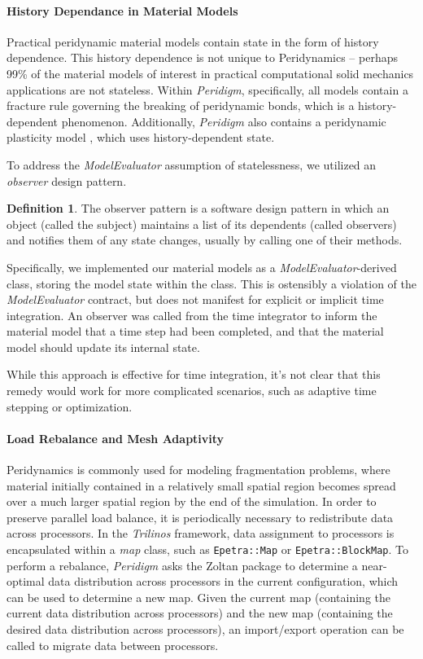 \documentclass[pdf,ps2pdf,12pt,report]{SANDreport}
\theoremstyle{plain}
\theoremstyle{definition}
\newtheorem{defn}{Definition}[section]
\theoremstyle{remark}
\numberwithin{equation}{section}
\begin{document}
\paragraph{History Dependance in Material Models}

Practical peridynamic material models contain state in the form of history dependence. This history dependence is not unique to Peridynamics -- perhaps 99\% of the material models of interest in practical computational solid mechanics applications are not stateless. Within \emph{Peridigm}, specifically, all models contain a fracture rule governing the breaking of peridynamic bonds, which is a history-dependent phenomenon. Additionally, \emph{Peridigm} also contains a peridynamic plasticity model \cite{Mitchell:2011:Plasticity}, which uses history-dependent state.

To address the \emph{ModelEvaluator} assumption of statelessness, we utilized an \emph{observer} design pattern.
\begin{defn}
The observer pattern is a software design pattern in which an object (called the subject) maintains a list of its dependents (called observers) and notifies them of any state changes, usually by calling one of their methods.
\end{defn}
Specifically, we implemented our material models as a \emph{ModelEvaluator}-derived class, storing the model state within the class. This is ostensibly a violation of the \emph{ModelEvaluator} contract, but does not manifest for explicit or implicit time integration. An observer was called from the time integrator to inform the material model that a time step had been completed, and that the material model should update its internal state.

While this approach is effective for time integration, it's not clear that this remedy would work for more complicated scenarios, such as adaptive time stepping or optimization.

\paragraph{Load Rebalance and Mesh Adaptivity}

Peridynamics is commonly used for modeling fragmentation problems, where material initially contained in a relatively small spatial region becomes spread over a much larger spatial region by the end of the simulation. In order to preserve parallel load balance, it is periodically necessary to redistribute data across processors. In the \emph{Trilinos} framework, data assignment to processors is encapsulated within a \emph{map} class, such as \verb"Epetra::Map" or \verb"Epetra::BlockMap". To perform a rebalance, \emph{Peridigm} asks the Zoltan package to determine a near-optimal data distribution across processors in the current configuration, which can be used to determine a new map. Given the current map (containing the current data distribution across processors) and the new map (containing the desired data distribution across processors), an import/export operation can be called to migrate data between processors.
\end{document}
